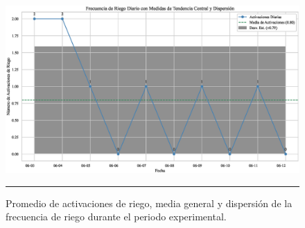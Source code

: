 \documentclass[pdflatex,sn-mathphys-num]{sn-jnl}%
\theoremstyle{thmstyleone}%
\theoremstyle{thmstyletwo}%
\theoremstyle{thmstylethree}%
\begin{document}
\begin{figure}[!ht]
    \centering
    \includegraphics[width=1\textwidth]{assets/activaciones_riego_promedio_y_estadisticas.eps}
    \caption{Promedio de activaciones de riego, media general y dispersión de la frecuencia de riego durante el periodo experimental.}
    \label{fig:activaciones_riego_dispersion}

    \vspace{0.4cm}

    \noindent
    \begin{minipage}[t]{0.45\textwidth}
        \justifying
	\end{minipage}%
    \hfill
    \begin{minipage}[t]{0.45\textwidth}
        \justifying

\end{minipage}

    \vspace{0.5cm}
    \hrule
\end{figure}
\begin{multicols}{2}
\justifying
\end{multicols}
\end{document}
